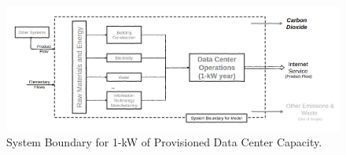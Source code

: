 \begin{figure}[h!]\centering
    \includegraphics[scale=0.25]{embodied_cost_model/images/system_boundary2.png}
    \caption[System Boundary Diagram]{System Boundary for 1-kW of Provisioned Data Center Capacity.}
    \label{system_boundary}
    \end{figure}